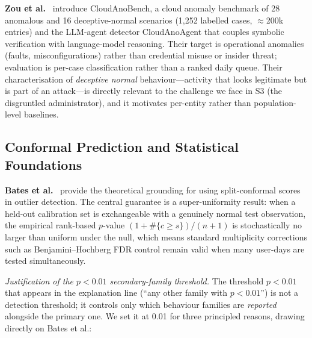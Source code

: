 \textbf{Zou et al.}~\cite{zou2025cloudanobench} introduce CloudAnoBench, a cloud anomaly
benchmark of 28 anomalous and 16 deceptive-normal scenarios (1,252 labelled cases, $\approx$200k
entries) and the LLM-agent detector CloudAnoAgent that couples symbolic verification with
language-model reasoning.
Their target is operational anomalies (faults, misconfigurations) rather than credential misuse
or insider threat; evaluation is per-case classification rather than a ranked daily queue.
Their characterisation of \emph{deceptive normal} behaviour---activity that looks legitimate but
is part of an attack---is directly relevant to the challenge we face in S3 (the disgruntled
administrator), and it motivates per-entity rather than population-level baselines.

\subsection{Conformal Prediction and Statistical Foundations}

\textbf{Bates et al.}~\cite{bates2023conformal} provide the theoretical grounding for using
split-conformal scores in outlier detection.
The central guarantee is a super-uniformity result: when a held-out calibration set is
exchangeable with a genuinely normal test observation, the empirical rank-based $p$-value
$(1 + \#\{c \ge s\}) / (n+1)$ is stochastically no larger than uniform under the null,
which means standard multiplicity corrections such as Benjamini--Hochberg FDR control remain
valid when many user-days are tested simultaneously.

\emph{Justification of the $p < 0.01$ secondary-family threshold.}
The threshold $p < 0.01$ that appears in the explanation line (``any other family with $p<0.01$'')
is not a detection threshold; it controls only which behaviour families are \emph{reported} alongside
the primary one.
We set it at 0.01 for three principled reasons, drawing directly on Bates et al.:

